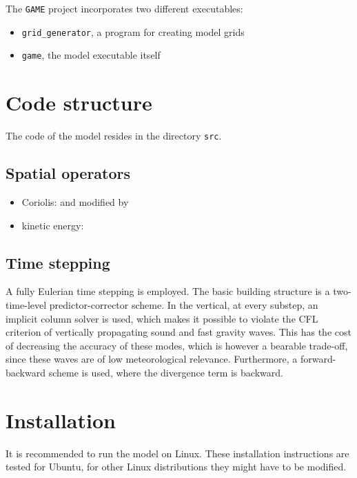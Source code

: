 \documentclass[10pt]{report}
\begin{document}
The \texttt{GAME} project incorporates two different executables:

\begin{itemize}
\item \texttt{grid\_generator}, a program for creating model grids
\item \texttt{game}, the model executable itself
\end{itemize}

\chapter{Code structure}
\label{chap:code_structure}

The code of the model resides in the directory \texttt{src}.

\section{Spatial operators}
\label{sec:spatial_operators}

\begin{itemize}
\item Coriolis: \cite{thuburn_f_discrete_plane} and \cite{ringler_trsk} modified by \cite{doi:10.1002/qj.3294}
\item kinetic energy: \cite{ringler_trsk}
\end{itemize}

\section{Time stepping}
\label{sec:time_stepping}

A fully Eulerian time stepping is employed. The basic building structure is a two-time-level predictor-corrector scheme. In the vertical, at every substep, an implicit column solver is used, which makes it possible to violate the CFL criterion of vertically propagating sound and fast gravity waves. This has the cost of decreasing the accuracy of these modes, which is however a bearable trade-off, since these waves are of low meteorological relevance. Furthermore, a forward-backward scheme is used, where the divergence term is backward.

\chapter{Installation}
\label{chap:installation}

It is recommended to run the model on Linux. These installation instructions are tested for Ubuntu, for other Linux distributions they might have to be modified.
\end{document}
